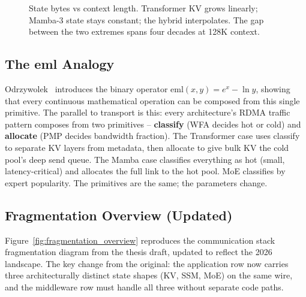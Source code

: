 \documentclass[11pt,letterpaper]{article}
\begin{document}
\begin{figure}[ht]
\centering
{}
\caption{State bytes vs context length. Transformer KV grows linearly; Mamba-3 state stays constant; the hybrid interpolates. The gap between the two extremes spans four decades at 128K context.}
\label{fig:state_vs_context}
\end{figure}

\subsection{The eml Analogy}

Odrzywolek~\cite{odrzywolek2026eml} introduces the binary operator $\text{eml}(x,y) = e^x - \ln y$, showing that every continuous mathematical operation can be composed from this single primitive. The parallel to transport is this: every architecture's RDMA traffic pattern composes from two primitives -- \textbf{classify} (WFA decides hot or cold) and \textbf{allocate} (PMP decides bandwidth fraction). The Transformer case uses classify to separate KV layers from metadata, then allocate to give bulk KV the cold pool's deep send queue. The Mamba case classifies everything as hot (small, latency-critical) and allocates the full link to the hot pool. MoE classifies by expert popularity. The primitives are the same; the parameters change.

\subsection{Fragmentation Overview (Updated)}

Figure~\ref{fig:fragmentation_overview} reproduces the communication stack fragmentation diagram from the thesis draft, updated to reflect the 2026 landscape. The key change from the original: the application row now carries three architecturally distinct state shapes (KV, SSM, MoE) on the same wire, and the middleware row must handle all three without separate code paths.
\end{document}
